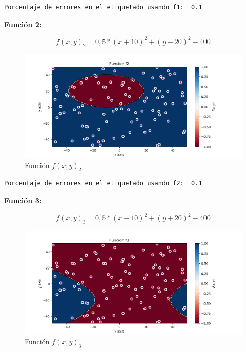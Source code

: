 \documentclass[12pt, spanish]{article}
\begin{document}
\begin{lstlisting}
Porcentaje de errores en el etiquetado usando f1:  0.1
\end{lstlisting}


\textbf{Función 2:} 

$$ f(x, y)_2 = 0,5*(x + 10)^2 + (y - 20)^2 - 400  $$

\begin{figure}[H]
  \centering
      \includegraphics[scale = 0.70]{ej1-3-f2-etiq.png}
 		 \caption{Función $f(x, y)_2$}
  		\label{fig:ej1-f2}

\end{figure}

\begin{lstlisting}
Porcentaje de errores en el etiquetado usando f2:  0.1
\end{lstlisting}



\textbf{Función 3:} 

$$ f(x, y)_3 = 0,5*(x - 10)^2 + (y + 20)^2 - 400 $$

\begin{figure}[H]
  \centering
      \includegraphics[scale = 0.70]{ej1-3-f3-etiq.png}
 		 \caption{Función $f(x, y)_3$}
  		\label{fig:ej1-f3}

\end{figure}
\end{document}
